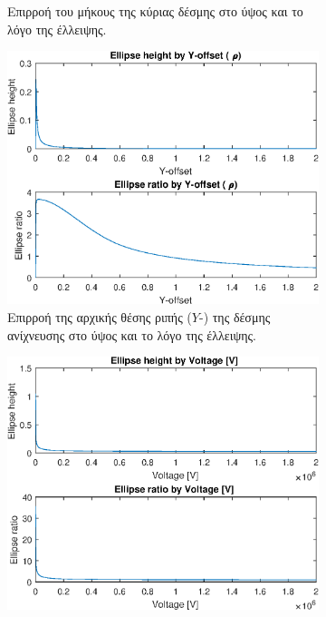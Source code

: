 \begin{figure}[tph]
\begin{subfigure}{0.47\textwidth}
		\centering
		\caption{Επιρροή του μήκους της κύριας δέσμης στο ύψος και το λόγο της έλλειψης.}
		\label{fig:EBS-variables-length}
	\end{subfigure}
	\par\bigskip
	\begin{subfigure}{0.47\textwidth}
		\includegraphics[width=\linewidth]{figures/MATLAB-variable-analysis/EBS-variables-rho}
		\centering
		\caption[Επιρροή της αρχικής θέσης ριπής της δέσμης ανίχνευσης στην ύψος και το λόγο της έλλειψης.]
		{Επιρροή της αρχικής θέσης ριπής ($Y$-) της δέσμης ανίχνευσης στο ύψος και το λόγο της έλλειψης.}
		\label{fig:EBS-variables-rho}
	\end{subfigure}
	\hfill
	\begin{subfigure}{0.47\textwidth}
		\includegraphics[width=\linewidth]{figures/MATLAB-variable-analysis/EBS-variables-voltage-linear}

\end{subfigure}
\end{figure}
